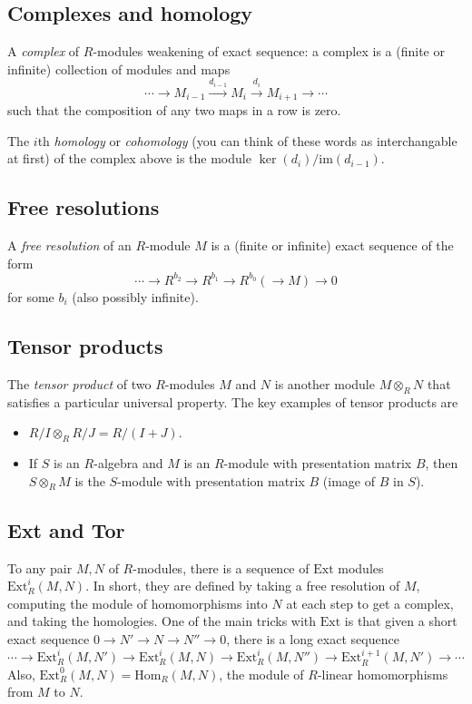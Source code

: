 \documentclass[12pt]{amsart}
\begin{document}
\subsection*{Complexes and homology} A \emph{complex} of $R$-modules weakening of exact sequence: a complex is a (finite or infinite) collection of modules and maps
\[ \cdots  \rightarrow M_{i-1} \xrightarrow{d_{i-1}} M_{i} \xrightarrow{d_{i}} M_{i+1} \rightarrow \cdots\]
such that the composition of any two maps in a row is zero.

The $i$th \emph{homology} or \emph{cohomology} (you can think of these words as interchangable at first) of the complex above is the module $\ker(d_i)/\mathrm{im}(d_{i-1})$.

\subsection*{Free resolutions} A \emph{free resolution} of an $R$-module $M$ is a (finite or infinite) exact sequence of the form
\[ \cdots\to  R^{b_2} \rightarrow R^{b_1} \rightarrow R^{b_0}(  \rightarrow M) \to 0\]
for some $b_i$ (also possibly infinite).

\subsection*{Tensor products} The \emph{tensor product} of two $R$-modules $M$ and $N$ is another module $M\otimes_R N$ that satisfies a particular universal property. The key examples of tensor products are
\begin{itemize} 
\item $R/I \otimes_R R/J = R/(I+J)$.
\item If $S$ is an $R$-algebra and $M$ is an $R$-module with presentation matrix $B$, then $S\otimes_R M$ is the $S$-module with presentation matrix $B$ (image of $B$ in $S$).
\end{itemize}


\subsection*{Ext and Tor} To any pair $M,N$ of $R$-modules, there is a sequence of $\mathrm{Ext}$ modules $\mathrm{Ext}^i_R(M,N)$. In short, they are defined by taking a free resolution of $M$, computing the module of homomorphisms into $N$ at each step to get a complex, and taking the homologies. One of the main tricks with $\mathrm{Ext}$ is that given a short exact sequence $0\to N' \to N \to N'' \to 0$, there is a long exact sequence
\[ \cdots \to \mathrm{Ext}^i_R(M,N') \to \mathrm{Ext}^i_R(M,N) \to \mathrm{Ext}^i_R(M,N'') \to \mathrm{Ext}^{i+1}_R(M,N') \to \cdots\]
Also, $\mathrm{Ext}^0_R(M,N)=\mathrm{Hom}_R(M,N)$, the module of $R$-linear homomorphisms from $M$ to $N$.
\end{document}
